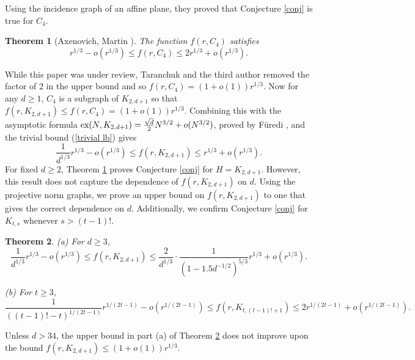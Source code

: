 \documentclass[12pt]{article}%
\newtheorem{theorem}{Theorem}[section]
\begin{document}
Using the incidence graph of an affine plane, they proved that Conjecture \ref{conj} is true for $C_4$.  

\begin{theorem}[Axenovich, Martin \cite{AxeMartin}]\label{AM:theorem2}
The function $f(r , C_4)$ satisfies 
\[
r^{1/3} - o (r^{1/3} ) 
\leq f( r , C_4) \leq 
2 r^{1/3}  + o ( r^{1/3} ) .
\]
\end{theorem}
While this paper was under review, Taranchuk and the third author \cite{Taranchuk2024} removed the factor of 2 in the upper bound and so 
$f(r,C_4) = (1 + o(1))r^{1/3}$.  Now for any $d \geq 1$, $C_4$ is a subgraph of $K_{2,d+1}$ so 
that $f(r,K_{2,d+1}) \leq f(r,C_4 ) = (1 + o(1))r^{1/3}$.    Combining this with the asymptotic formula 
 $\textup{ex}(N, K_{2,d+1})= \frac{\sqrt{d}}{2} N^{3/2} + o(N^{3/2})$, proved by F\"{u}redi \cite{Furedi}, and 
 the trivial bound (\ref{trivial lb}) gives
  \[
 \frac{1}{d^{1/3}} r^{1/3} - o(r^{1/3} ) 
 \leq f( r , K_{2,d+1}) 
 \leq r^{1/3}  + o (r^{1/3} ).
 \]
 For fixed $d \geq 2$, Theorem \ref{AM:theorem2} proves Conjecture \ref{conj} for $H = K_{2,d+1}$.  However, this result does not capture the dependence of $f(r, K_{2,d+1})$ on $d$.   
 Using the projective norm graphs, we prove an upper bound on $f(r, K_{2,d+1})$ to one that gives the correct dependence on $d$.  Additionally, we confirm Conjecture \ref{conj} for $K_{ t , s}$ whenever $s>(t-1)!$.

\begin{theorem}\label{theorem:ktt}
(a) For $d \geq 3$,  
\[
 \frac{1}{d^{1/3}}   r^{1/3}  - o(r^{1/3}) \leq 
f( r , K_{2,d + 1} ) \leq 
\frac{2}{d^{1/3}} \cdot \frac{1}{( 1 - 1.5 d^{-1/2} )^{5/3} }r^{1/3} + o(r^{1/3}).
\]

\smallskip
\noindent
(b) 
For $t \geq 3$,
\[
\frac{1}{  (  (t-1)! - t )^{ 1/ (2t - 1 ) } } 
r^{1/(2t-1) } - o (r^{ 1 / (2t-1) })
 \leq 
 f( r , K_{ t , (t-1)! + 1  } ) 
 \leq 2 r^{ 1 / (2t-1) } +  o ( r^{ 1/ (2t - 1)  } ).
\]
 \end{theorem}
Unless $d > 34$, the upper bound in part (a) of Theorem \ref{theorem:ktt} does not improve upon the bound   
$f(r,K_{2,d+1}) \leq (1 + o(1))r^{1/3}$.    
 
\end{document}
